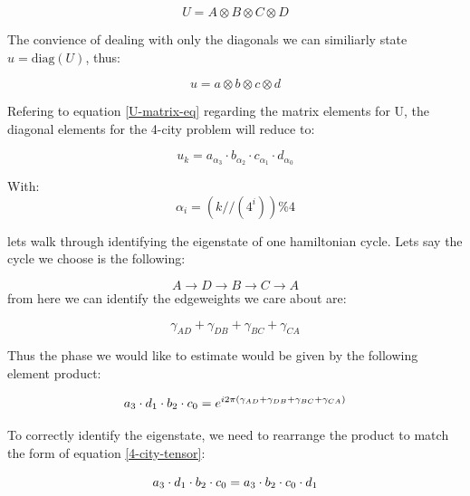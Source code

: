 \documentclass[msc,oneside]{ubcthesis}
\begin{document}
	\begin{equation}\label{4-city-matrix-tensor}
	 U = A \otimes B \otimes C \otimes D
	\end{equation}
	
	The convience of dealing with only the diagonals we can similiarly state $ u = \mathrm{diag}(U)$, thus:
	
	$$ u = a \otimes b \otimes c \otimes d$$
	
	
	Refering to equation \ref{U-matrix-eq} regarding the matrix elements for U,  the diagonal elements for the 4-city problem will reduce to:
	
	\begin{equation}\label{4-city-tensor}
		u_{k} = a_{\alpha_{3}}\cdot b _{\alpha_{2}} \cdot c_{\alpha_1} \cdot d_{\alpha_{0}}
	\end{equation}
	
	With: $$\alpha_i = \left(k//\left(4^{i}\right)\right) \% 4$$
	
	
	\vspace{0.5cm}
	
	lets walk through identifying the eigenstate of one hamiltonian cycle. Lets say the cycle we choose is the following:
	
	\begin{equation}\label{one-ham-cycle-4-city}
		A \rightarrow D \rightarrow B \rightarrow C \rightarrow A
	\end{equation}
	from here we can identify the edgeweights we care about are:
	
	\begin{equation*}
		\gamma_{AD} + \gamma_{DB} + \gamma_{BC} + \gamma_{CA}
	\end{equation*}
	
	Thus the phase we would like to estimate would be given by the following element product:
	
	\begin{equation*}
		\Large{a_{3} \cdot d_{1} \cdot b_{2} \cdot c_{0} = e^{i2\pi (\gamma_{AD} + \gamma_{DB} + \gamma_{BC} + \gamma_{CA})}}
	\end{equation*}
	
	
	To correctly identify the eigenstate, we need to rearrange the product to match the form of equation \ref{4-city-tensor}:
	
	\begin{equation*}
		\Large{a_{3} \cdot d_{1} \cdot b_{2} \cdot c_{0} = \Large{a_{3}} \cdot b_{2} \cdot c_{0}  \cdot d_{1}}
	\end{equation*}
	
\end{document}
